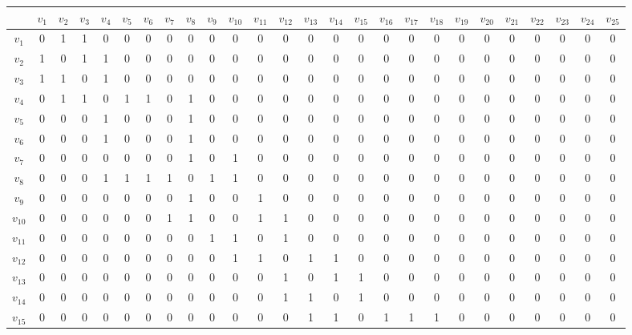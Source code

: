 \begin{tabular}{c|ccccccccccccccccccccccccc}
 & $v_{1}$ & $v_{2}$ & $v_{3}$ & $v_{4}$ & $v_{5}$ & $v_{6}$ & $v_{7}$ & $v_{8}$ & $v_{9}$ & $v_{10}$ & $v_{11}$ & $v_{12}$ & $v_{13}$ & $v_{14}$ & $v_{15}$ & $v_{16}$ & $v_{17}$ & $v_{18}$ & $v_{19}$ & $v_{20}$ & $v_{21}$ & $v_{22}$ & $v_{23}$ & $v_{24}$ & $v_{25}$ \\ \hline
$v_{1}$ & 0 & 1 & 1 & 0 & 0 & 0 & 0 & 0 & 0 & 0 & 0 & 0 & 0 & 0 & 0 & 0 & 0 & 0 & 0 & 0 & 0 & 0 & 0 & 0 & 0 \\
$v_{2}$ & 1 & 0 & 1 & 1 & 0 & 0 & 0 & 0 & 0 & 0 & 0 & 0 & 0 & 0 & 0 & 0 & 0 & 0 & 0 & 0 & 0 & 0 & 0 & 0 & 0 \\
$v_{3}$ & 1 & 1 & 0 & 1 & 0 & 0 & 0 & 0 & 0 & 0 & 0 & 0 & 0 & 0 & 0 & 0 & 0 & 0 & 0 & 0 & 0 & 0 & 0 & 0 & 0 \\
$v_{4}$ & 0 & 1 & 1 & 0 & 1 & 1 & 0 & 1 & 0 & 0 & 0 & 0 & 0 & 0 & 0 & 0 & 0 & 0 & 0 & 0 & 0 & 0 & 0 & 0 & 0 \\
$v_{5}$ & 0 & 0 & 0 & 1 & 0 & 0 & 0 & 1 & 0 & 0 & 0 & 0 & 0 & 0 & 0 & 0 & 0 & 0 & 0 & 0 & 0 & 0 & 0 & 0 & 0 \\
$v_{6}$ & 0 & 0 & 0 & 1 & 0 & 0 & 0 & 1 & 0 & 0 & 0 & 0 & 0 & 0 & 0 & 0 & 0 & 0 & 0 & 0 & 0 & 0 & 0 & 0 & 0 \\
$v_{7}$ & 0 & 0 & 0 & 0 & 0 & 0 & 0 & 1 & 0 & 1 & 0 & 0 & 0 & 0 & 0 & 0 & 0 & 0 & 0 & 0 & 0 & 0 & 0 & 0 & 0 \\
$v_{8}$ & 0 & 0 & 0 & 1 & 1 & 1 & 1 & 0 & 1 & 1 & 0 & 0 & 0 & 0 & 0 & 0 & 0 & 0 & 0 & 0 & 0 & 0 & 0 & 0 & 0 \\
$v_{9}$ & 0 & 0 & 0 & 0 & 0 & 0 & 0 & 1 & 0 & 0 & 1 & 0 & 0 & 0 & 0 & 0 & 0 & 0 & 0 & 0 & 0 & 0 & 0 & 0 & 0 \\
$v_{10}$ & 0 & 0 & 0 & 0 & 0 & 0 & 1 & 1 & 0 & 0 & 1 & 1 & 0 & 0 & 0 & 0 & 0 & 0 & 0 & 0 & 0 & 0 & 0 & 0 & 0 \\
$v_{11}$ & 0 & 0 & 0 & 0 & 0 & 0 & 0 & 0 & 1 & 1 & 0 & 1 & 0 & 0 & 0 & 0 & 0 & 0 & 0 & 0 & 0 & 0 & 0 & 0 & 0 \\
$v_{12}$ & 0 & 0 & 0 & 0 & 0 & 0 & 0 & 0 & 0 & 1 & 1 & 0 & 1 & 1 & 0 & 0 & 0 & 0 & 0 & 0 & 0 & 0 & 0 & 0 & 0 \\
$v_{13}$ & 0 & 0 & 0 & 0 & 0 & 0 & 0 & 0 & 0 & 0 & 0 & 1 & 0 & 1 & 1 & 0 & 0 & 0 & 0 & 0 & 0 & 0 & 0 & 0 & 0 \\
$v_{14}$ & 0 & 0 & 0 & 0 & 0 & 0 & 0 & 0 & 0 & 0 & 0 & 1 & 1 & 0 & 1 & 0 & 0 & 0 & 0 & 0 & 0 & 0 & 0 & 0 & 0 \\
$v_{15}$ & 0 & 0 & 0 & 0 & 0 & 0 & 0 & 0 & 0 & 0 & 0 & 0 & 1 & 1 & 0 & 1 & 1 & 1 & 0 & 0 & 0 & 0 & 0 & 0 & 0 \\

\end{tabular}

